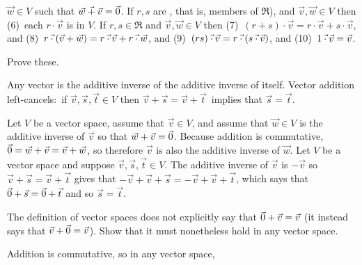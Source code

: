 \begin{exercises}
\begin{answer}
{          
          \( \vec{w}\in V \) such that \( \vec{w}\mathbin{\vec{+}}\vec{v}=\vec{0} \).
        If \( r,s \) are ,
        that is, members of \( \Re \)),
        and \( \vec{v},\vec{w}\in V \) then 
        (6)~each
           \( r\cdot\vec{v} \) is in \( V \).
        If \( r,s\in\Re \) and \( \vec{v},\vec{w}\in V \) then
        (7)~\( (r+ s)\cdot\vec{v}=r\cdot\vec{v}\plus s\cdot\vec{v} \), 
        and (8)~\( r\mathbin{\vec{\cdot}} (\vec{v}+\vec{w})
           =r\mathbin{\vec{\cdot}}\vec{v}+r\mathbin{\vec{\cdot}}\vec{w} \),
        and (9)~\( (rs)\mathbin{\vec{\cdot}} \vec{v} =r\mathbin{\vec{\cdot}} (s\mathbin{\vec{\cdot}}\vec{v}) \),
        and (10)~\( 1\mathbin{\vec{\cdot}} \vec{v}=\vec{v} \).
     }
    \end{answer}
  \recommended \item 
    Prove these.
    \begin{exparts}
      \partsitem Any vector is the additive inverse of the additive inverse of
        itself.
      \partsitem Vector addition left-cancels:~if 
        \( \vec{v},\vec{s},\vec{t}\in V \)
        then \( \vec{v}+\vec{s}=\vec{v}+\vec{t}\, \) implies
        that \( \vec{s}=\vec{t} \).
    \end{exparts}
    \begin{answer}
      \begin{exparts}
        \partsitem Let \( V \) be a vector space, 
          assume that \( \vec{v}\in V \), and
          assume that \( \vec{w}\in V \) is the additive inverse of $\vec{v}$
          so that \( \vec{w}+\vec{v}=\vec{0} \).
          Because addition is commutative,
          \( \vec{0}=\vec{w}+\vec{v}=\vec{v}+\vec{w} \),
          so therefore \( \vec{v} \) is also 
          the additive inverse of \( \vec{w} \).
        \partsitem Let \( V \) be a vector space and suppose
          \( \vec{v},\vec{s},\vec{t}\in V \).
          The additive inverse of \( \vec{v} \) is \( -\vec{v} \) so
          \( \vec{v}+\vec{s}=\vec{v}+\vec{t} \) gives that
          \( -\vec{v}+\vec{v}+\vec{s}=-\vec{v}+\vec{v}+\vec{t} \),
          which says that \( \vec{0}+\vec{s}=\vec{0}+\vec{t} \) and so
          \( \vec{s}=\vec{t} \).
      \end{exparts}  
     \end{answer}
  \item 
    The definition of vector spaces does not explicitly say that
    \( \vec{0}+\vec{v}=\vec{v} \) 
    (it instead says that \( \vec{v}+\vec{0}=\vec{v} \)).
    Show that it must nonetheless hold in any vector space.
    \begin{answer}
      Addition is commutative, so in any vector space,

\end{answer}
\end{exercises}
